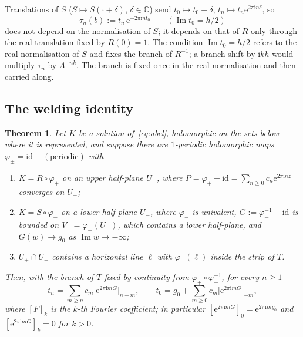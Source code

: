 \documentclass[11pt]{amsart}
\newtheorem{theorem}{Theorem}[section]
\theoremstyle{definition}
\newcommand{\Rr}{R}
\newcommand{\Kk}{K}
\newcommand{\eee}{\mathrm{e}}
\newcommand{\ii}{\mathrm{i}}
\begin{document}
Translations of $S$ ($S\mapsto S(\cdot+\delta)$, $\delta\in\mathbb C$) send
$t_0\mapsto t_0+\delta$, $t_n\mapsto t_n\eee^{2\pi\ii n\delta}$, so
\begin{equation}\label{eq:taun}
 \tau_n(b):=t_n\,\eee^{-2\pi\ii n t_0}\qquad(\operatorname{Im}t_0=h/2)
\end{equation}
does not depend on the normalisation of $S$; it depends on that of $\Rr$
only through the real translation fixed by $\Rr(0)=1$.  The condition
$\operatorname{Im}t_0=h/2$ refers to the real normalisation of $S$ and fixes the
branch of $\Rr^{-1}$; a branch shift by $\ii kh$ would multiply $\tau_n$ by
$\Lambda^{-nk}$.  The branch is fixed once in the real normalisation and then
carried along.

\subsection{The welding identity}

\begin{theorem}\label{thm:welding}
Let $\Kk$ be a solution of~\eqref{eq:abel}, holomorphic on the sets below
where it is represented, and suppose there are
$1$-periodic holomorphic maps $\varphi_\pm=\mathrm{id}+(\text{periodic})$ with
\begin{enumerate}
\item $\Kk=\Rr\circ\varphi_+$ on an upper half-plane $U_+$, where
  $P=\varphi_+-\mathrm{id}=\sum_{n\ge0}c_n\eee^{2\pi\ii nz}$ converges on $U_+$;
\item $\Kk=S\circ\varphi_-$ on a lower half-plane $U_-$, where $\varphi_-$ is
  univalent, $G:=\varphi_-^{-1}-\mathrm{id}$ is bounded on
  $V_-=\varphi_-(U_-)$, which contains a lower half-plane, and
  $G(w)\to g_0$ as $\operatorname{Im}w\to-\infty$;
\item $U_+\cap U_-$ contains a horizontal line $\ell$ with $\varphi_-(\ell)$
  inside the strip of $T$.
\end{enumerate}
Then, with the branch of $T$ fixed by continuity from $\varphi_+\circ\varphi_-^{-1}$,
for every $n\ge1$
\begin{equation}\label{eq:welding}
 t_n=\sum_{m\ge n}c_m\bigl[\eee^{2\pi\ii mG}\bigr]_{n-m},\qquad
 t_0=g_0+\sum_{m\ge0}c_m\bigl[\eee^{2\pi\ii mG}\bigr]_{-m},
\end{equation}
where $[F]_k$ is the $k$-th Fourier coefficient; in particular
$[\eee^{2\pi\ii mG}]_0=\eee^{2\pi\ii mg_0}$ and $[\eee^{2\pi\ii mG}]_k=0$ for $k>0$.
\end{theorem}
\end{document}
